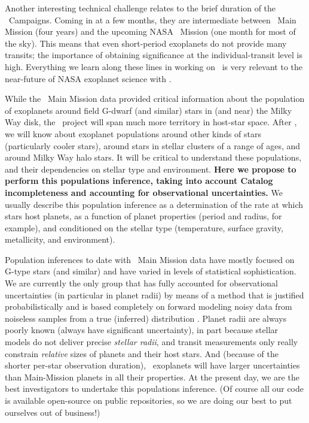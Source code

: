 \documentclass[12pt,preprint]{aastex}
\begin{document}
Another interesting technical challenge relates to the brief duration
of the \kt\ Campaigns.
Coming in at a few months, they are intermediate between \kepler\ Main
Mission (four years) and the upcoming NASA \tess\ Mission (one month for most of the sky).
This means that even short-period exoplanets do not provide many
transits; the importance of obtaining significance at the
individual-transit level is high.
Everything we learn along these lines in working on \kt\ is very
relevant to the near-future of NASA exoplanet science with \tess.

While the \kepler\ Main Mission data provided critical information
about the population of exoplanets around field G-dwarf (and similar) stars
in (and near) the Milky Way disk, the \kt\ project will span much more
territory in host-star space.
After \kt, we will know about exoplanet populations around other kinds
of stars (particularly cooler stars), around stars in stellar clusters
of a range of ages, and around Milky Way halo stars.
It will be critical to understand these populations, and their
dependencies on stellar type and environment.
\textbf{Here we propose to perform this populations inference, taking
  into account Catalog incompleteness and accounting for observational
  uncertainties.}
We usually describe this population inference as a determination of the
rate at which stars host planets, as a function of planet properties
(period and radius, for example), and conditioned on the stellar type
(temperature, surface gravity, metallicity, and environment).

Population inferences to date with \kepler\ Main Mission data
\citep{Youdin:2011, Howard:2012, Dong:2013, Petigura:2013,
Foreman-Mackey:2014, Dressing:2015} have
mostly focused on G-type stars (and similar) and have varied in levels of
statistical sophistication.
We are currently the only group that has fully accounted for
observational uncertainties (in particular in planet radii) by means
of a method that is justified probabilistically and is based
completely on forward modeling noisy data from noiseless samples from
a true (inferred) distribution \citep{Foreman-Mackey:2014}.
Planet radii are always poorly known (always have significant
uncertainty), in part because stellar models do not deliver precise
\emph{stellar radii}, and transit measurements only really constrain
\emph{relative} sizes of planets and their host stars.
And (because of the shorter per-star observation duration),
\kt\ exoplanets will have larger uncertainties than Main-Mission
planets in all their properties.
At the present day, we are the best investigators to undertake this
populations inference.
(Of course all our code is available open-source on public
 repositories, so we are doing our best to put
ourselves out of business!)
\end{document}
